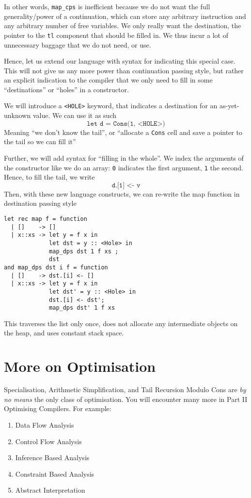 In other words, \texttt{map\_cps} is inefficient because we do not want the full generality/power of a continuation, which can store any arbitrary instruction and any arbitrary number of free variables. We only really want the destination, the pointer to the \texttt{tl} component that should be filled in. We thus incur a lot of unnecessary baggage that we do not need, or use.

Hence, let us extend our language with syntax for indicating this special case. This will not give us any more power than continuation passing style, but rather an explicit indication to the compiler that we only need to fill in some ``destinations'' or ``holes'' in a constructor. 

We will introduce a \texttt{<HOLE>} keyword, that indicates a destination for an as-yet-unknown value. We can use it as such
\[\texttt{let d = Cons(1, <HOLE>)}\]
Meaning ``we don't know the tail'', or ``allocate a \texttt{Cons} cell and save a pointer to the tail so we can fill it''

Further, we will add syntax for ``filling in the whole''. We index the arguments of the constructor like we do an array: \texttt{0} indicates the first argument, \texttt{1} the second. Hence, to fill the tail, we write
\[\texttt{d.[1] <- v}\]
Then, with these new language constructs, we can re-write the map function in destination passing style
\begin{verbatim}
let rec map f = function
  | []    -> []
  | x::xs -> let y = f x in
             let dst = y :: <Hole> in
             map_dps dst 1 f xs ;
             dst
and map_dps dst i f = function
  | []    -> dst.[i] <- []
  | x::xs -> let y = f x in
             let dst' = y :: <Hole> in
             dst.[i] <- dst';
             map_dps dst' 1 f xs
\end{verbatim}
This traverses the list only once, does not allocate any intermediate objects on the heap, and uses constant stack space. 

\section{More on Optimisation}
Specialisation, Arithmetic Simplification, and Tail Recursion Modulo Cons are \textit{by no means} the only class of optimisation. You will encounter many more in \textsf{Part II Optimising Compilers}. For example:
\begin{enumerate}
    \item Data Flow Analysis
    \item Control Flow Analysis
    \item Inference Based Analysis
    \item Constraint Based Analysis
    \item Abstract Interpretation
\end{enumerate}

